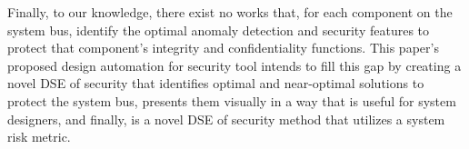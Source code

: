 Finally, to our knowledge, there exist no works that, for each component on the system bus, identify the optimal anomaly detection and security features to protect that component's integrity and confidentiality functions. This paper's proposed design automation for security tool intends to fill this gap by creating a novel DSE of security that identifies optimal and near-optimal solutions to protect the system bus, presents them visually in a way that is useful for system designers, and finally, is a novel DSE of security method that utilizes a system risk metric.
